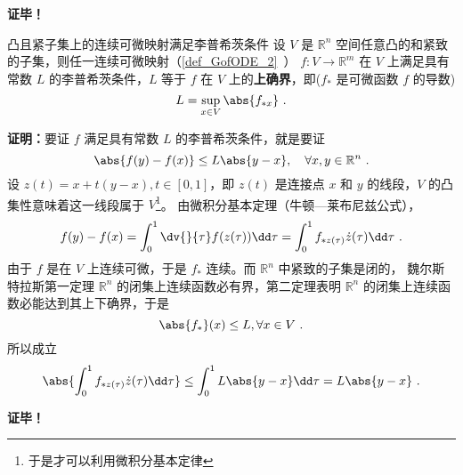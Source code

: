 \textbf{证毕！}

\begin{theorem}{凸且紧子集上的连续可微映射满足李普希茨条件}
设 $V$ 是 $\mathbb R^n$ 空间任意凸的和紧致的子集，则任一连续可微映射（\autoref{def_GofODE_2}~） $f:V\rightarrow \mathbb R^m$ 在 $V$ 上满足具有常数 $L$ 的李普希茨条件，$L$ 等于 $f$ 在 $V$ 上的\textbf{上确界}，即($f_*$ 是可微函数 $f$ 的导数)
\begin{equation}
L=\sup_{x\in V}\abs{f_{*x}}~.
\end{equation}
\end{theorem}
\textbf{证明：}要证 $f$ 满足具有常数 $L$ 的李普希茨条件，就是要证
\begin{equation}
\abs{f(y)-f(x)}\leq L\abs{y-x},\quad\forall x,y\in\mathbb R^n~.
\end{equation}
设 $z(t)=x+t(y-x),t\in[0,1]$，即 $z(t)$ 是连接点 $x$ 和 $y$ 的线段，$V$ 的凸集性意味着这一线段属于 $V$\footnote{于是才可以利用微积分基本定律}。
由微积分基本定理（牛顿—莱布尼兹公式），
\begin{equation}
f(y)-f(x)=\int_0^1\dv{}{\tau}f(z(\tau))\dd\tau=\int_0^1f_{*z(\tau)}\dot z(\tau)\dd\tau~.
\end{equation}
由于 $f$ 是在 $V$ 上连续可微，于是 $f_*$ 连续。而 $\mathbb R^n$ 中紧致的子集是闭的， 魏尔斯特拉斯第一定理 $\mathbb R^n$ 的闭集上连续函数必有界，第二定理表明 $\mathbb R^n$ 的闭集上连续函数必能达到其上下确界，于是
 \begin{equation}
 \abs{f_*}(x)\leq L ,\forall x\in V ~.
 \end{equation}
所以成立
\begin{equation}
\abs{\int_0^1f_{*z(\tau)}\dot z(\tau)\dd\tau}\leq\int_0^1L\abs{y-x}\dd\tau=L\abs{y-x}~.
\end{equation}

\textbf{证毕！}